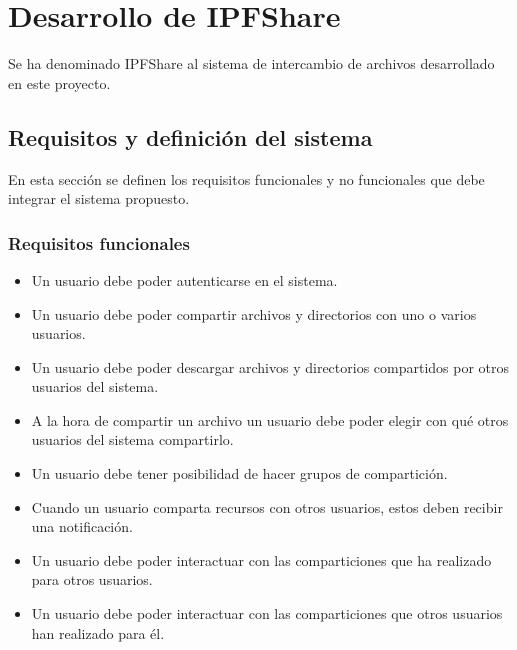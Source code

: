 \chapter{Desarrollo de IPFShare}\label{chap:4desarrollo}
Se ha denominado IPFShare al sistema de intercambio de archivos desarrollado en este proyecto.
\section{Requisitos y definición del sistema}
En esta sección se definen los requisitos funcionales y no funcionales que debe integrar el sistema propuesto.
\subsection{Requisitos funcionales}
\begin{itemize}[noitemsep,after=\vspace{-0.6\baselineskip}]
  \item Un usuario debe poder autenticarse en el sistema.
  \item Un usuario debe poder compartir archivos y directorios con uno o varios usuarios.
  \item Un usuario debe poder descargar archivos y directorios compartidos por otros usuarios del sistema.
  \item A la hora de compartir un archivo un usuario debe poder elegir con qué otros usuarios del sistema compartirlo.
  \item Un usuario debe tener posibilidad de hacer grupos de compartición.
  \item Cuando un usuario comparta recursos con otros usuarios, estos deben recibir una notificación.
  \item Un usuario debe poder interactuar con las comparticiones que ha realizado para otros usuarios.
  \item Un usuario debe poder interactuar con las comparticiones que otros usuarios han realizado para él.
\end{itemize}
